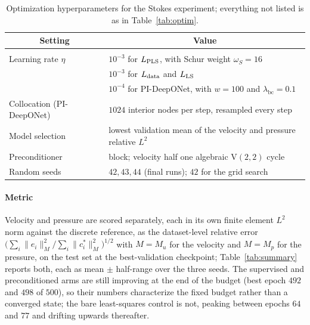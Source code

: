 \documentclass{article} %
\begin{document}
\begin{table}[htb]
   \caption{Optimization hyperparameters for the Stokes experiment; everything not listed is as in Table~\ref{tab:optim}.}
   \label{tab:optim_stokes}
   \begin{center}
   \begin{tabular}{ll}
      \multicolumn{1}{c}{\bf Setting} & \multicolumn{1}{c}{\bf Value} \\ \hline \\
      Learning rate $\eta$      & $10^{-3}$ for $L_\textup{PLS}$, with Schur weight $\omega_S = 16$ \\
                                & $10^{-3}$ for $L_\textup{data}$ and $L_\textup{LS}$ \\
                                & $10^{-4}$ for PI-DeepONet, with $w = 100$ and $\lambda_{\mathrm{bc}} = 0.1$ \\
      Collocation (PI-DeepONet) & $1024$ interior nodes per step, resampled every step \\
      Model selection           & lowest validation mean of the velocity and pressure relative $L^2$ \\
      Preconditioner            & block; velocity half one algebraic V$(2,2)$ cycle \\
      Random seeds              & $42, 43, 44$ (final runs); $42$ for the grid search \\
   \end{tabular}
   \end{center}
\end{table}

\paragraph{Metric} Velocity and pressure are scored separately, each in its own finite element $L^2$ norm against the discrete reference, as the dataset-level relative error $\big(\sum_i \|e_i\|_M^2 / \sum_i \|c^*_i\|_M^2\big)^{1/2}$ with $M = M_u$ for the velocity and $M = M_p$ for the pressure, on the test set at the best-validation checkpoint; Table~\ref{tab:summary} reports both, each as mean $\pm$ half-range over the three seeds. The supervised and preconditioned arms are still improving at the end of the budget (best epoch $492$ and $498$ of $500$), so their numbers characterize the fixed budget rather than a converged state; the bare least-squares control is not, peaking between epochs $64$ and $77$ and drifting upwards thereafter.
\end{document}
